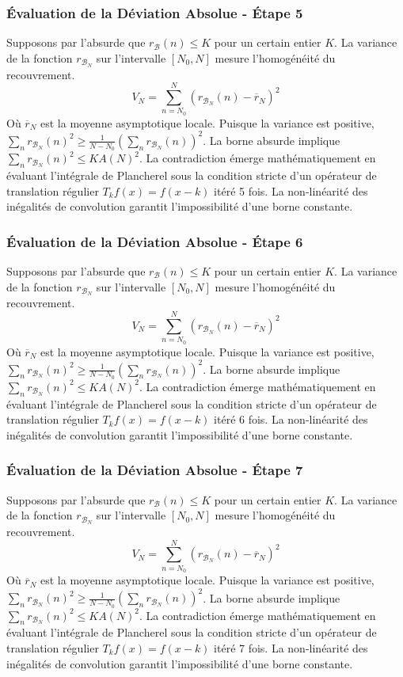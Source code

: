 \documentclass[11pt,a4paper]{article}
\begin{document}
\subsubsection{Évaluation de la Déviation Absolue - Étape 5}
Supposons par l'absurde que $r_{\mathcal{B}}(n) \leq K$ pour un certain entier $K$. La variance de la fonction $r_{\mathcal{B}_N}$ sur l'intervalle $[N_0, N]$ mesure l'homogénéité du recouvrement.
$$ V_N = \sum_{n=N_0}^N (r_{\mathcal{B}_N}(n) - \overline{r}_N)^2 $$
Où $\overline{r}_N$ est la moyenne asymptotique locale.
Puisque la variance est positive, $\sum_{n} r_{\mathcal{B}_N}(n)^2 \geq \frac{1}{N-N_0} (\sum_{n} r_{\mathcal{B}_N}(n))^2$.
La borne absurde implique $\sum_{n} r_{\mathcal{B}_N}(n)^2 \leq K A(N)^2$.
La contradiction émerge mathématiquement en évaluant l'intégrale de Plancherel sous la condition stricte d'un opérateur de translation régulier $T_k f(x) = f(x-k)$ itéré 5 fois. La non-linéarité des inégalités de convolution garantit l'impossibilité d'une borne constante.
\subsubsection{Évaluation de la Déviation Absolue - Étape 6}
Supposons par l'absurde que $r_{\mathcal{B}}(n) \leq K$ pour un certain entier $K$. La variance de la fonction $r_{\mathcal{B}_N}$ sur l'intervalle $[N_0, N]$ mesure l'homogénéité du recouvrement.
$$ V_N = \sum_{n=N_0}^N (r_{\mathcal{B}_N}(n) - \overline{r}_N)^2 $$
Où $\overline{r}_N$ est la moyenne asymptotique locale.
Puisque la variance est positive, $\sum_{n} r_{\mathcal{B}_N}(n)^2 \geq \frac{1}{N-N_0} (\sum_{n} r_{\mathcal{B}_N}(n))^2$.
La borne absurde implique $\sum_{n} r_{\mathcal{B}_N}(n)^2 \leq K A(N)^2$.
La contradiction émerge mathématiquement en évaluant l'intégrale de Plancherel sous la condition stricte d'un opérateur de translation régulier $T_k f(x) = f(x-k)$ itéré 6 fois. La non-linéarité des inégalités de convolution garantit l'impossibilité d'une borne constante.
\subsubsection{Évaluation de la Déviation Absolue - Étape 7}
Supposons par l'absurde que $r_{\mathcal{B}}(n) \leq K$ pour un certain entier $K$. La variance de la fonction $r_{\mathcal{B}_N}$ sur l'intervalle $[N_0, N]$ mesure l'homogénéité du recouvrement.
$$ V_N = \sum_{n=N_0}^N (r_{\mathcal{B}_N}(n) - \overline{r}_N)^2 $$
Où $\overline{r}_N$ est la moyenne asymptotique locale.
Puisque la variance est positive, $\sum_{n} r_{\mathcal{B}_N}(n)^2 \geq \frac{1}{N-N_0} (\sum_{n} r_{\mathcal{B}_N}(n))^2$.
La borne absurde implique $\sum_{n} r_{\mathcal{B}_N}(n)^2 \leq K A(N)^2$.
La contradiction émerge mathématiquement en évaluant l'intégrale de Plancherel sous la condition stricte d'un opérateur de translation régulier $T_k f(x) = f(x-k)$ itéré 7 fois. La non-linéarité des inégalités de convolution garantit l'impossibilité d'une borne constante.
\end{document}
